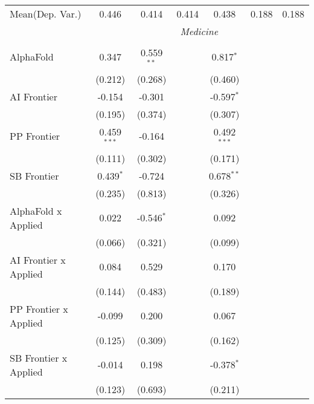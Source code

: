 \begin{tabular}{lcccccc}
Mean(Dep. Var.) & 0.446 & 0.414 & 0.414 & 0.438 & 0.188 & 0.188 \\
 & \multicolumn{6}{c}{\textit{Medicine}} \\ \\
   AlphaFold                      & 0.347         & 0.559$^{**}$ &               & 0.817$^{*}$   &        &   \\   
                                  & (0.212)       & (0.268)      &               & (0.460)       &        &   \\   
   AI Frontier                    & -0.154        & -0.301       &               & -0.597$^{*}$  &        &   \\   
                                  & (0.195)       & (0.374)      &               & (0.307)       &        &   \\   
   PP Frontier                    & 0.459$^{***}$ & -0.164       &               & 0.492$^{***}$ &        &   \\   
                                  & (0.111)       & (0.302)      &               & (0.171)       &        &   \\   
   SB Frontier                    & 0.439$^{*}$   & -0.724       &               & 0.678$^{**}$  &        &   \\   
                                  & (0.235)       & (0.813)      &               & (0.326)       &        &   \\   
   AlphaFold x Applied            & 0.022         & -0.546$^{*}$ &               & 0.092         &        &   \\   
                                  & (0.066)       & (0.321)      &               & (0.099)       &        &   \\   
   AI Frontier x Applied          & 0.084         & 0.529        &               & 0.170         &        &   \\   
                                  & (0.144)       & (0.483)      &               & (0.189)       &        &   \\   
   PP Frontier x Applied          & -0.099        & 0.200        &               & 0.067         &        &   \\   
                                  & (0.125)       & (0.309)      &               & (0.162)       &        &   \\   
   SB Frontier x Applied          & -0.014        & 0.198        &               & -0.378$^{*}$  &        &   \\   
                                  & (0.123)       & (0.693)      &               & (0.211)       &        &   \\   

\end{tabular}
